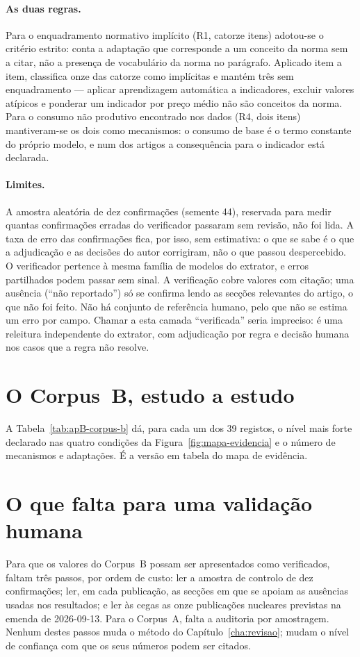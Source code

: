 \paragraph{As duas regras.} Para o enquadramento normativo implícito (R1,
catorze itens) adotou-se o critério estrito: conta a adaptação que corresponde
a um conceito da norma sem a citar, não a presença de vocabulário da norma no
parágrafo. Aplicado item a item, classifica onze das catorze como implícitas
e mantém três sem enquadramento --- aplicar aprendizagem automática a
indicadores, excluir valores atípicos e ponderar um indicador por preço médio
não são conceitos da norma. Para o consumo não produtivo encontrado nos dados
(R4, dois itens) mantiveram-se os dois como mecanismos: o consumo de base é o
termo constante do próprio modelo, e num dos artigos a consequência para o
indicador está declarada.

\paragraph{Limites.} A amostra aleatória de dez confirmações (semente 44),
reservada para medir quantas confirmações erradas do verificador passaram sem
revisão, não foi lida. A taxa de erro das confirmações fica, por isso, sem
estimativa: o que se sabe é o que a adjudicação e as decisões do autor
corrigiram, não o que passou despercebido. O verificador pertence à mesma
família de modelos do extrator, e erros partilhados podem passar sem sinal. A verificação cobre
valores com citação; uma ausência (``não reportado'') só se confirma lendo as
secções relevantes do artigo, o que não foi feito. Não há conjunto de
referência humano, pelo que não se estima um erro por campo. Chamar a esta
camada ``verificada'' seria impreciso: é uma releitura independente do
extrator, com adjudicação por regra e decisão humana nos casos que a regra
não resolve.

\section{O Corpus~B, estudo a estudo}
\label{sec:apB-tabela}

A Tabela~\ref{tab:apB-corpus-b} dá, para cada um dos 39 registos, o nível mais
forte declarado nas quatro condições da Figura~\ref{fig:mapa-evidencia} e o
número de mecanismos e adaptações. É a versão em tabela do mapa de evidência.



\section{O que falta para uma validação humana}
\label{sec:apB-falta}

Para que os valores do Corpus~B possam ser apresentados como verificados, faltam
três passos, por ordem de custo: ler a amostra de controlo de dez
confirmações; ler, em cada publicação, as secções em
que se apoiam as ausências usadas nos resultados; e ler às cegas as onze
publicações nucleares previstas na emenda de 2026-09-13. Para o Corpus~A,
falta a auditoria por amostragem. Nenhum destes passos muda o método do
Capítulo~\ref{cha:revisao}; mudam o nível de confiança com que os seus
números podem ser citados.
